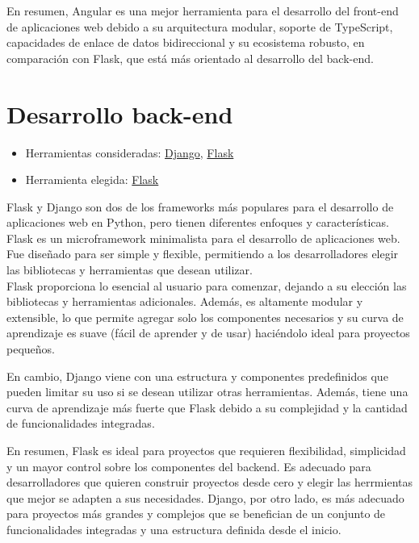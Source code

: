 En resumen, Angular es una mejor herramienta para el desarrollo del front-end de aplicaciones web debido a su arquitectura modular, soporte de TypeScript, capacidades de enlace de datos bidireccional y su ecosistema robusto, en comparación con Flask, que está más orientado al desarrollo del back-end.

\section{Desarrollo back-end}
\begin{itemize}
    \item Herramientas consideradas: \href{https://www.djangoproject.com/}{Django}, \href{https://flask.palletsprojects.com/en/3.0.x/}{Flask} 
    \item Herramienta elegida: \href{https://flask.palletsprojects.com/en/3.0.x/}{Flask} 
\end{itemize}

Flask y Django son dos de los frameworks más populares para el desarrollo de aplicaciones web en Python, pero tienen diferentes enfoques y características. \\
Flask es un microframework minimalista para el desarrollo de aplicaciones web. Fue diseñado para ser simple y flexible, permitiendo a los desarrolladores elegir las bibliotecas y herramientas que desean utilizar. \\
Flask proporciona lo esencial al usuario para comenzar, dejando a su elección las bibliotecas y herramientas adicionales. Además, es altamente modular y extensible, lo que permite agregar solo los componentes necesarios y su curva de aprendizaje es suave (fácil de aprender y de usar) haciéndolo ideal para proyectos pequeños.

En cambio, Django viene con una estructura y componentes predefinidos que pueden limitar su uso si se desean utilizar otras herramientas. Además, tiene una curva de aprendizaje más fuerte que Flask debido a su complejidad y la cantidad de funcionalidades integradas.

En resumen, Flask es ideal para proyectos que requieren flexibilidad, simplicidad y un mayor control sobre los componentes del backend. Es adecuado para desarrolladores que quieren construir proyectos desde cero y elegir las herrmientas que mejor se adapten a sus necesidades. Django, por otro lado, es más adecuado para proyectos más grandes y complejos que se benefician de un conjunto de funcionalidades integradas y una estructura definida desde el inicio.

